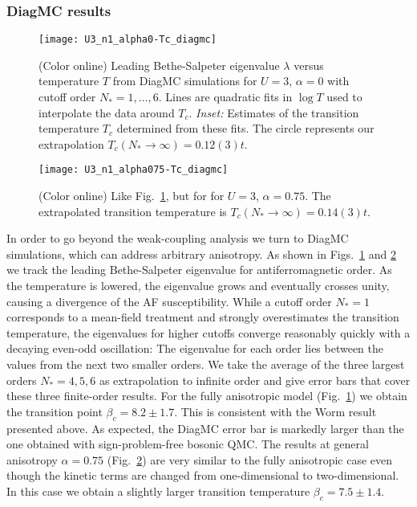 \documentclass[twocolumn,superscriptaddress,pra,showpacs,longbibliography]{revtex4-1}
\newcommand{\<}{\langle}
\renewcommand{\>}{\rangle}
\begin{document}
\subsubsection{DiagMC results} \label{sec:diagmc-results}

\begin{figure}[!htb]
\texttt{[image: U3\_n1\_alpha0-Tc\_diagmc]}
\caption{(Color online) Leading Bethe-Salpeter eigenvalue $\lambda$ versus temperature $T$ from DiagMC simulations for $U=3$, $\alpha=0$ with cutoff order $N_* = 1, \dots, 6$. Lines are quadratic fits in $\log T$ used to interpolate the data around $T_c$. \textit{Inset:} Estimates of the transition temperature $T_c$ determined from these fits. The circle represents our extrapolation $T_c(N_* \to \infty) = 0.12(3) t$.} 
\label{fig:diagmc-alpha0}
\end{figure}

\begin{figure}[!htb]
\texttt{[image: U3\_n1\_alpha075-Tc\_diagmc]}
\caption{(Color online) Like Fig.~\ref{fig:diagmc-alpha0}, but for  for $U=3$, $\alpha=0.75$. The extrapolated transition temperature is $T_c(N_* \to \infty) = 0.14(3) t$.} 
\label{fig:diagmc-alpha075}
\end{figure}

In order to go beyond the weak-coupling analysis we turn to DiagMC simulations, which can address arbitrary anisotropy. As shown in Figs.~\ref{fig:diagmc-alpha0} and \ref{fig:diagmc-alpha075} we track the leading Bethe-Salpeter eigenvalue for antiferromagnetic order. As the temperature is lowered, the eigenvalue grows and eventually crosses unity, causing a divergence of the AF susceptibility. While a cutoff order $N_*=1$ corresponds to a mean-field treatment and strongly overestimates the transition temperature, the eigenvalues for higher cutoffs converge reasonably quickly with a decaying even-odd oscillation: The eigenvalue for each order lies between the values from the next two smaller orders. We take the average of the three largest orders $N_*=4, 5, 6$ as extrapolation to infinite order and give error bars that cover these three finite-order results.
For the fully anisotropic model (Fig.~\ref{fig:diagmc-alpha0}) we obtain the transition point $\beta_c = 8.2 \pm 1.7$. This is consistent with the Worm result presented above. As expected, the DiagMC error bar is markedly larger than the one obtained with sign-problem-free bosonic QMC.
The results at general anisotropy $\alpha=0.75$ (Fig.~\ref{fig:diagmc-alpha075}) are very similar to the fully anisotropic case even though the kinetic terms are changed from one-dimensional to two-dimensional. In this case we obtain a slightly larger transition temperature $\beta_c = 7.5 \pm 1.4$.
\end{document}
